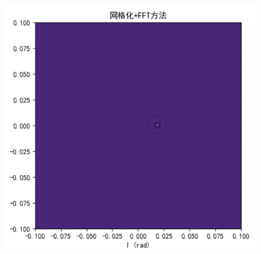 \documentclass{article}
\begin{document}
    \begin{figure}[htp]
    \centering
    \includegraphics[width=1\textwidth]{task4/task4_gridfft_dirty.png}
    \label{fig:gridfft}
    \end{figure}
\end{document}
